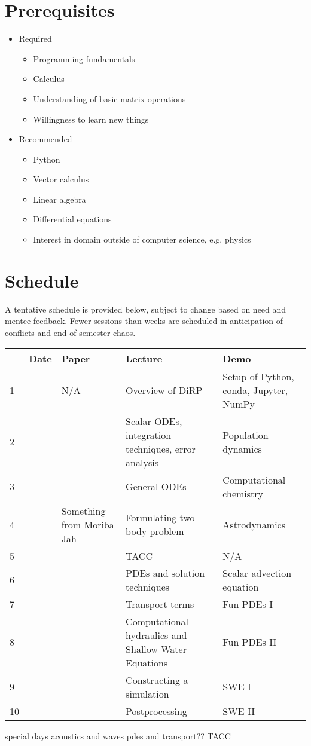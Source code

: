 \documentclass{article}
\begin{document}
	\section*{Prerequisites}
	\begin{itemize}
		\item Required
		\begin{itemize}
			\item Programming fundamentals
			\item Calculus
			\item Understanding of basic matrix operations
			\item Willingness to learn new things
		\end{itemize}
		\item Recommended
		\begin{itemize}
			\item Python
			\item Vector calculus
			\item Linear algebra
			\item Differential equations
			\item Interest in domain outside of computer science, e.g. physics
		\end{itemize}
	\end{itemize}

	\section*{Schedule}
	A tentative schedule is provided below, subject to change based on need and mentee feedback. Fewer sessions than weeks are scheduled in anticipation of conflicts and end-of-semester chaos.
	
	\begin{tabular}{l|lp{3cm}p{4cm}p{4cm}}
		& Date & Paper & Lecture & Demo \\
		\hline
		1 &  & N/A & Overview of DiRP & Setup of Python, conda, Jupyter, NumPy \\
		\hline
		2 &  &  & Scalar ODEs, integration techniques, error analysis & Population dynamics \\
		\hline
		3 &  &  & General ODEs & Computational chemistry \\
		\hline
		4 &  & Something from Moriba Jah & Formulating two-body problem & Astrodynamics \\
		\hline
		5 &  &  & TACC & N/A \\
		\hline
		6 &  &  & PDEs and solution techniques & Scalar advection equation \\
		\hline
		7 &  &  & Transport terms & Fun PDEs I \\
		\hline
		8 &  &  & Computational hydraulics and Shallow Water Equations & Fun PDEs II \\
		\hline
		9 &  &  & Constructing a simulation & SWE I \\
		\hline
		10 &  &  & Postprocessing & SWE II \\
	\end{tabular}
	
	special days
	acoustics and waves
	pdes and transport??
	TACC
\end{document}
